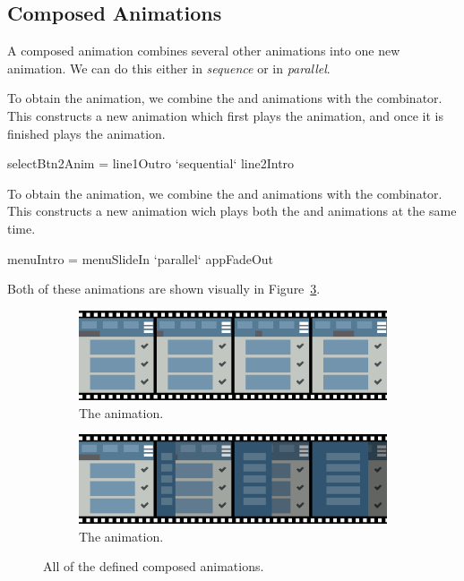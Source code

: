 \subsection{Composed Animations}

A composed animation combines several other animations into one new animation. We can do this either in \emph{sequence} or in \emph{parallel}.

To obtain the  animation, we combine the  and  animations with the  combinator. This constructs a new animation which first plays the  animation, and once it is finished plays the  animation.

\begin{spec}
selectBtn2Anim = line1Outro `sequential` line2Intro
\end{spec}

To obtain the  animation, we combine the  and  animations with the  combinator. This constructs a new animation wich plays both the  and  animations at the same time.

\begin{spec}
menuIntro = menuSlideIn `parallel` appFadeOut
\end{spec}

Both of these animations are shown visually in Figure~\ref{fig:composed}.

\begin{figure}[!htbp]
\centering

\begin{subfigure}[h]{\textwidth}
\centering
\includegraphics[width=\figscale\textwidth]{pictures/selectBtn2AnimFig}
\caption{The  animation.}
\label{fig:composed1}
\end{subfigure}

\begin{subfigure}[h]{\textwidth}
\centering
\includegraphics[width=\figscale\textwidth]{pictures/menuIntroFig}
\caption{The  animation.}
\label{fig:composed2}
\end{subfigure}

\caption{All of the defined composed animations.}
\label{fig:composed}
\end{figure}
